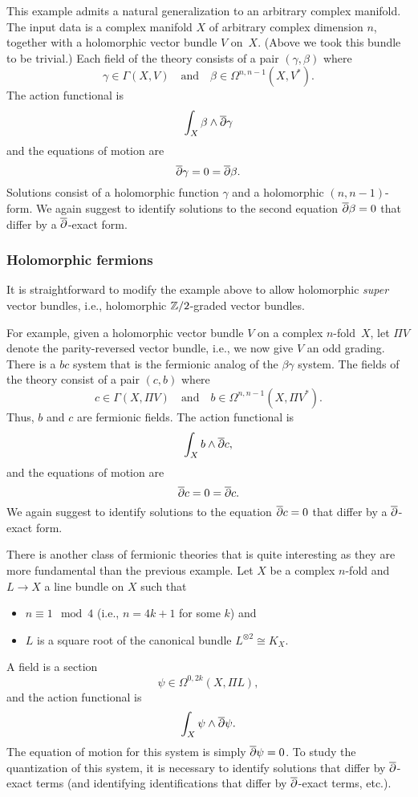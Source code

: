 \documentclass[11pt]{amsart}
\begin{document}
This example admits a natural generalization to an arbitrary complex manifold.
The input data is a complex manifold $X$ of arbitrary complex dimension $n$, 
together with a holomorphic vector bundle $V$ on~$X$.
(Above we took this bundle to be trivial.)
Each field of the theory consists of a pair $(\gamma,\beta)$ where 
\[
\gamma \in \Gamma(X,V) \quad\text{and}\quad \beta \in \Omega^{n,n-1}(X,V^*) .
\]
The action functional is 
\[
\int_X \beta \wedge {\overline{\partial}} \gamma
\]
and the equations of motion are
\[
{\overline{\partial}} \gamma = 0 = {\overline{\partial}} \beta.
\]
Solutions consist of a holomorphic function $\gamma$ and a holomorphic $(n,n-1)$-form.
We again suggest to identify solutions to the second equation ${\overline{\partial}} \beta = 0$ that differ by a ${\overline{\partial}}$-exact form.

\subsubsection{Holomorphic fermions}

It is straightforward to modify the example above to allow holomorphic {\it super} vector bundles,
i.e., holomorphic $\mathbb Z/2$-graded vector bundles.

For example, given a holomorphic vector bundle $V$ on a complex $n$-fold~$X$,
let $\Pi V$ denote the parity-reversed vector bundle,
i.e., we now give $V$ an odd grading.
There is a $bc$ system that is the fermionic analog of the $\beta\gamma$ system.
The fields of the theory consist of a pair $(c,b)$ where 
\[
c \in \Gamma(X,\Pi V) \quad\text{and}\quad b \in \Omega^{n,n-1}(X,\Pi V^*) .
\]
Thus, $b$ and $c$ are fermionic fields.
The action functional is 
\[
\int_X b \wedge {\overline{\partial}} c,
\]
and the equations of motion are
\[
{\overline{\partial}} c = 0 = {\overline{\partial}} c.
\]
We again suggest to identify solutions to the equation ${\overline{\partial}} c = 0$ that differ by a ${\overline{\partial}}$-exact form.

There is another class of fermionic theories that is quite interesting as they are more fundamental than the previous example.
Let $X$ be a complex $n$-fold and $L \to X$ a line bundle on $X$ such that
\begin{itemize}
\item $n \equiv 1 \mod 4$ (i.e., $n=4k+1$ for some $k$) and
\item $L$ is a square root of the canonical bundle $L^{\otimes 2} \cong K_X$.
\end{itemize}
A field is a section
\[
\psi \in \Omega^{0,2k}(X,\Pi L),
\]
and the action functional is
\[ 
\int_X \psi \wedge {\overline{\partial}} \psi .
\]
The equation of motion for this system is simply ${\overline{\partial}} \psi = 0$.
To study the quantization of this system, it is necessary to identify solutions that differ by ${\overline{\partial}}$-exact terms (and identifying identifications that differ by ${\overline{\partial}}$-exact terms, etc.).
\end{document}
